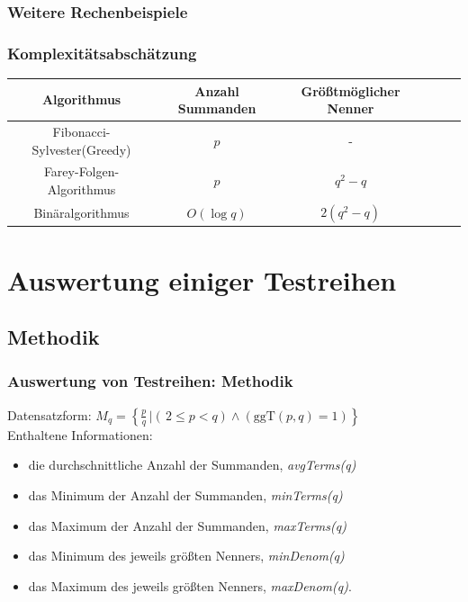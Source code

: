 \documentclass{beamer}
\begin{document}
\begin{frame}
	\frametitle{Weitere Rechenbeispiele}
\end{frame}

\begin{frame}
\frametitle{Komplexitätsabschätzung}
\scriptsize{
	\begin{tabular}{|Sc | Sc | Sc|}
		\hline
		Algorithmus & Anzahl Summanden & Größtmöglicher Nenner\\
		\hline
		Fibonacci-Sylvester\newline(Greedy) & $p$ & - \\
		\hline
		Farey-Folgen-Algorithmus & $p$ & $q^2-q$\\
		\hline
		Binäralgorithmus & $O(\log q)$ & $2(q^2-q)$\\
		\hline
\end{tabular}}
\end{frame}

\section{Auswertung einiger Testreihen}
\subsection{Methodik}

\begin{frame}
	\frametitle{Auswertung von Testreihen: Methodik}
	Datensatzform: $M_q = \left\{ \frac{p}{q} \, | \left(\, 2\leq p < q\right) \wedge \left(\text{ggT}(p,q) = 1\right)\right\}$\\ \vspace{1cm}
	Enthaltene Informationen:
	\begin{itemize}
		\item die durchschnittliche Anzahl der Summanden, \emph{avgTerms(q)}
		\item das Minimum der Anzahl der Summanden, \emph{minTerms(q)}
		\item das Maximum der Anzahl der Summanden, \emph{maxTerms(q)}
		\item das Minimum des jeweils größten Nenners, \emph{minDenom(q)}
		\item das Maximum des jeweils größten Nenners, \emph{maxDenom(q)}.
	\end{itemize}
\end{frame}
\end{document}
